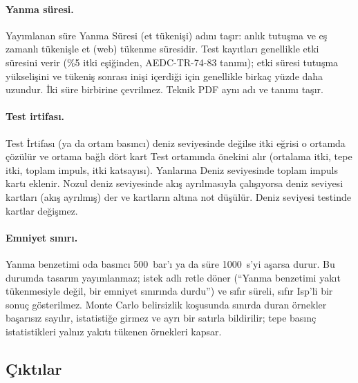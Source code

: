 \documentclass[11pt,a4paper]{article}
\newcommand{\ui}[1]{\textsf{#1}}
\begin{document}
\paragraph{Yanma süresi.} Yayımlanan süre \ui{Yanma Süresi (et tükenişi)}
adını taşır: anlık tutuşma ve eş zamanlı tükenişle et (web) tükenme süresidir.
Test kayıtları genellikle etki süresini verir (\%5 itki eşiğinden, AEDC-TR-74-83
tanımı); etki süresi tutuşma yükselişini ve tükeniş sonrası inişi içerdiği için
genellikle birkaç yüzde daha uzundur. İki süre birbirine çevrilmez. Teknik PDF
aynı adı ve tanımı taşır.

\paragraph{Test irtifası.} \ui{Test İrtifası} (ya da ortam basıncı) deniz
seviyesinde değilse itki eğrisi o ortamda çözülür ve ortama bağlı dört kart
\ui{Test ortamında} önekini alır (ortalama itki, tepe itki, toplam impuls, itki
katsayısı). Yanlarına \ui{Deniz seviyesinde toplam impuls} kartı eklenir.
Nozul deniz seviyesinde akış ayrılmasıyla çalışıyorsa deniz seviyesi kartları
\ui{(akış ayrılmış)} der ve kartların altına not düşülür. Deniz seviyesi
testinde kartlar değişmez.

\paragraph{Emniyet sınırı.} Yanma benzetimi oda basıncı 500~bar'ı ya da süre
1000~s'yi aşarsa durur. Bu durumda tasarım yayımlanmaz; istek adlı retle
döner (``Yanma benzetimi yakıt tükenmesiyle değil, bir emniyet sınırında
durdu'') ve sıfır süreli, sıfır Isp'li bir sonuç gösterilmez. Monte Carlo
belirsizlik koşusunda sınırda duran örnekler başarısız sayılır, istatistiğe
girmez ve ayrı bir satırla bildirilir; tepe basınç istatistikleri yalnız
yakıtı tükenen örnekleri kapsar.

\subsection{Çıktılar}
\end{document}
